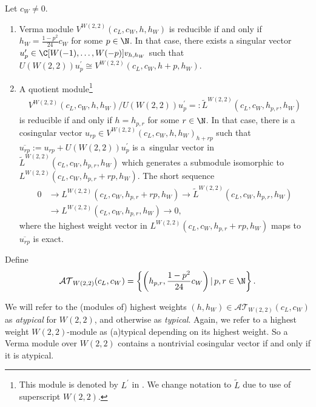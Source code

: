\begin{Theorem}\label{W-struktura}Let $c_{W}\neq0$.
\begin{enumerate}\itemsep=0pt
\item[$(i)$]Verma module $V^{W(2,2)}(c_{L},c_{W},h,h_{W}) $ is reducible if and only if $h_{W}=\frac{1-p^{2}}{24}c_{W}$ for some $p\in \N$. In that case, there exists a singular vector $u_p^{\prime}\in \C [ W(-1) ,\ldots,W(-p)]v_{h,h_W} $ such that $U(W(2,2)) u_p^{\prime} \cong V^{W(2,2)}(c_{L},c_{W},h+p,h_{W}) $.

\item[$(ii)$]A quotient module\footnote{This module is denoted by $L^{\prime}$ in \cite{JZ,R-JMP}. We
change notation to $\widetilde{L}$ due to use of superscript $W(2,2)$.}
\begin{gather*}V^{W(2,2)}(c_{L},c_{W},h,h_{W}) / U(W(2,2)) u_p^{\prime} =: \widetilde{L}^{W(2,2)}( c_{L},c_{W},h_{p,r},h_{W})
\end{gather*}
is reducible if and only if $ h = h_{p,r} $ for some $r\in\N$. In that case, there is a cosingular vector $%
u_{rp}\in V^{W(2,2)}(c_{L},c_{W},h,h_{W}) _{h+rp}$ such that $\overline{u_{rp}} := u_{rp} + U(W(2,2)) u_p^{\prime}$ is a~singular vector in $\widetilde{L}^{W(2,2)}( c_{L},c_{W},h_{p,r},h_{W})$ which generates a submodule isomorphic to $L^{W(2,2)}( c_{L},c_{W},h_{p,r}+rp,h_{W})$. The short sequence
\begin{align}
0 &\rightarrow L^{W(2,2)}(c_{L},c_{W},h_{p,r}+rp,h_{W}) \rightarrow\widetilde{L}^{W(2,2)} ( c_{L},c_{W},h_{p,r},h_{W} ) \nonumber \\
&\rightarrow L^{W(2,2)} ( c_{L},c_{W},h_{p,r},h_{W} ) \rightarrow 0, \label{seq}
\end{align}
where the highest weight vector in $L^{W(2,2)}(c_{L},c_{W},h_{p,r}+rp,h_{W})$ maps to $\overline{u_{rp}}$ is exact.
\end{enumerate}
\end{Theorem}

Def\/ine
\begin{gather*}
{\mathcal {AT} }_{W(2,2) } ( c_L, c_{W} ) = \left\{ \left(h_{p,r}, \frac{1-p^2}{24}c_W\right) |\, p,r \in \N \right\}.
\end{gather*}
\begin{Remark}
We will refer to the (modules of) highest weights $(h, h_W) \in {\mathcal {AT} }_{W(2,2) } ( c_L, c_{W} ) $ as \textit{atypical} for $W(2,2)$, and otherwise as \textit{typical}. Again, we refer to a highest weight $W(2,2)$-module as (a)typical depending on its highest weight. So a Verma module over $W(2,2)$ contains a nontrivial cosingular vector if and only if it is atypical.
\end{Remark}

